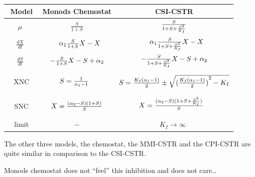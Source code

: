 \documentclass[a4paper, 10pt, twoside, openright]{book}
\begin{document}
\begin{tabular}{|c|c|c|} \hline %
$\phantom{\Bigg(}$Model$\phantom{\Bigg(}$ & Monods Chemostat & CSI-CSTR \\ 
\hline %
$\mu\phantom{\Bigg(}$
& $\frac{ S} {1+S}$
& $\frac{ S} {1+S+\frac{{S}^{2}}{{K}_{I}}}$ \\ %
$\frac{dX}{dt} \phantom{\Bigg(}$ 
& $\phantom{-}{\alpha}_{1}\frac{ S}{1+S}X-X$        
& $\phantom{-}{\alpha}_{1}\frac{ S}{1+S+\frac{{S}^{2}}{{K}_{I}}}X-X $  \\
$\frac{dS}{dt} \phantom{\Bigg)}$ 
& $-\frac{S} {1+S}X-S+{\alpha}_{2} $        
& $-\frac{S} {1+S+\frac{{S}^{2}}{{K}_{I}}}X-S+{\alpha}_{2}$        \\ %
XNC%
& $S=\frac{1}{{\alpha}_{1} - 1} \phantom{\Bigg(}$
& $S=\frac{{K}_{I}({\alpha}_{1}-1)}{2}\pm\sqrt{{(\frac{{K}_{I}({\alpha}_{1}-1)}{2})}^{2}-{K}_{I}}$ \\
SNC%
& $ X= \frac{ ({\alpha}_{2}-S)(1+S) }  { S }$ 
& $ X=
\frac{({\alpha}_{2}-S)(1+S+\frac{{S}^{2}}{{K}_{I}})}{S}\phantom{\Bigg(} $\\ 
limit%
& $-$
& $ K_I \rightarrow \infty\phantom{\Bigg(}$  \\ \hline 
\end{tabular}




The other three models, the chemostat, the MMI-CSTR and the CPI-CSTR
are quite similar in comparison to the CSI-CSTR. 

Monods chemostat does not ``feel'' this inhibition and does not care\ldots 





\end{document}

